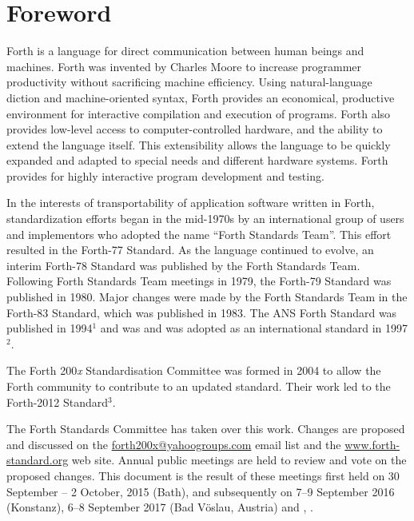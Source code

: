 
\vspace*{-6ex}\chapter*{Foreword}
\label{foreword}

Forth is a language for direct communication between human beings and
machines. Forth was invented by Charles Moore to increase programmer
productivity without sacrificing machine efficiency.
Using natural-language diction and machine-oriented syntax,
Forth provides an economical, productive environment for interactive
compilation and execution of programs. Forth also provides low-level
access to computer-controlled hardware, and the ability to extend the
language itself. This extensibility allows the language to be quickly
expanded and adapted to special needs and different hardware systems.
Forth provides for highly interactive program development and testing.

In the interests of transportability of application software written in
Forth, standardization efforts began in the mid-1970s by an international
group of users and implementors who adopted the name ``Forth Standards Team''.
This effort resulted in the Forth-77 Standard. As the language continued
to evolve, an interim Forth-78 Standard was published by the Forth Standards
Team. Following Forth Standards Team meetings in 1979, the Forth-79 Standard
was published in 1980. Major changes were made by the Forth Standards Team
in the Forth-83 Standard, which was published in 1983.
The ANS Forth Standard was published in 1994$^1$ and was
and was adopted as an international standard in 1997$^2$.





The Forth 200\emph{x} Standardisation Committee was formed in 2004
to allow the Forth community to contribute to an updated standard.
Their work led to the Forth-2012 Standard$^3$.

The Forth Standards Committee has taken over this work.  
Changes are proposed and discussed on the
\href{email:forth200x@yahoogroups.com}{forth200x@yahoogroups.com}
email list and the \href{href://www.forth-standard.org/}{www.forth-standard.org}
web site.
Annual public meetings are held to review and vote on the proposed changes.
This document is the result of these meetings first held on
30 September -- 2 October, 2015 (Bath), and subsequently on
7--9 September 2016 (Konstanz),
6--8 September 2017 (Bad V\"oslau, Austria)
and 
,
.
